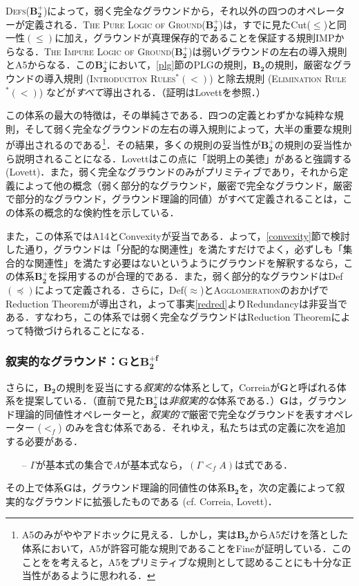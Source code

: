 \documentclass[twoside,14Q,uplatex,dvipdfmx]{jsarticle}
\theoremstyle{definition}
\begin{document}
\textsc{Defs}($\mathbf{B_{2}^{+}}$)によって，弱く完全なグラウンドから，それ以外の四つのオペレーターが定義される．\textsc{The Pure Logic of Ground}($\mathbf{B_{2}^{+}}$)は，すでに見たCut($\leq$)と同一性$(\leq)$に加え，グラウンドが真理保存的であることを保証する規則IMPからなる．\textsc{The Impure Logic of Ground}($\mathbf{B_{2}^{+}}$)は弱いグラウンドの左右の導入規則とA5からなる．この$\mathbf{B_{2}^{+}}$において，\ref{plg}節の\textsc{PLG}の規則，$\mathbf{B_{2}}$の規則，厳密なグラウンドの導入規則 (\textsc{Introduciton Rules$^{*}(<)$}) と除去規則 (\textsc{Elimination Rule$^{*}(<)$}) などが\emph{すべて}導出される．（証明はLovett\cite{Lovett2020}を参照．）

この体系の最大の特徴は，その単純さである．四つの定義とわずかな純粋な規則，そして弱く完全なグラウンドの左右の導入規則によって，大半の重要な規則が導出されるのである\footnote{A5のみがややアドホックに見える．しかし，実は$\mathbf{B_{2}}$からA5だけを落とした体系において，A5が許容可能な規則であることをFine\cite{Fine2016}が証明している．このことをを考えると，A5をプリミティブな規則として認めることにも十分な正当性があるように思われる．}．その結果，多くの規則の妥当性が$\mathbf{B_{2}^{+}}$の規則の妥当性から説明されることになる．Lovettはこの点に「説明上の美徳」があると強調する (Lovett\cite[p.32]{Lovett2020})．また，弱く完全なグラウンドのみがプリミティブであり，それから定義によって他の概念（弱く部分的なグラウンド，厳密で完全なグラウンド，厳密で部分的なグラウンド，グラウンド理論的同値）がすべて定義されることは，この体系の概念的な倹約性を示している．

また，この体系ではA14とConvexityが妥当である．よって，\ref{convexity}節で検討した通り，グラウンドは「分配的な関連性」を満たすだけでよく，必ずしも「集合的な関連性」を満たす必要はないというようにグラウンドを解釈するなら，この体系$\mathbf{B_{2}^{+}}$を採用するのが合理的である．また，弱く部分的なグラウンドはDef$(\preceq)$によって定義される．さらに，Def($\approx$)と\textsc{Agglomeration}のおかげでReduction Theoremが導出され，よって事実\ref{redred}よりRedundancyは非妥当である．すなわち，この体系では弱く完全なグラウンドはReduction Theoremによって特徴づけられることになる．
%
%
%
\subsubsection{叙実的なグラウンド：$\mathbf{G}$と$\mathbf{B_{2}^{+f}}$}
さらに，$\mathbf{B_{2}}$の規則を妥当にする\emph{叙実的な}体系として，Correia\cite{Correia2010}が$\mathbf{G}$と呼ばれる体系を提案している．（直前で見た$\mathbf{B_{2}^{+}}$は\emph{非叙実的な}体系である．）$\mathbf{G}$は，グラウンド理論的同値性オペレーターと，\emph{叙実的で}厳密で完全なグラウンドを表すオペレーター ($<_{f}$) のみを含む体系である．それゆえ，私たちは式の定義に次を追加する必要がある．
	\begin{itemize}
	\item[--] $\Gamma$が基本式の集合で$A$が基本式なら，$(\Gamma<_{f}A)$は式である．
	\end{itemize}
その上で体系$\mathbf{G}$は，グラウンド理論的同値性の体系$\mathbf{B_{2}}$を，次の定義によって叙実的なグラウンドに拡張したものである (cf. Correia\cite{Correia2010}, Lovett\cite{Lovett2020})．
\end{document}
